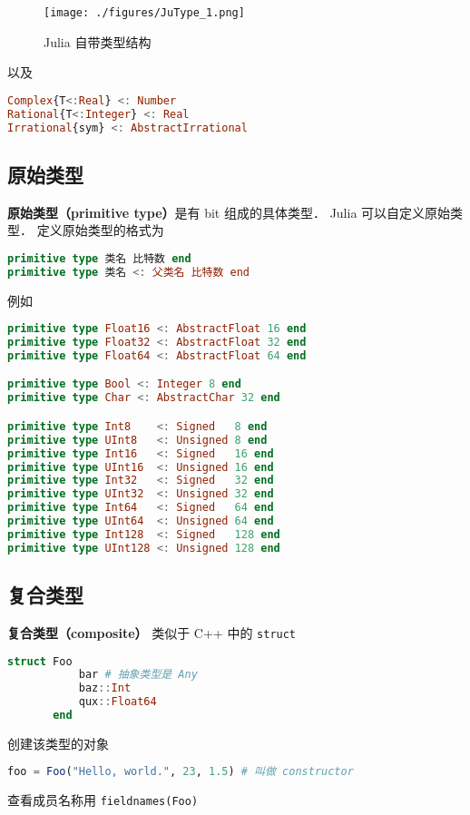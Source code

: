 \begin{figure}[ht]
\centering
\texttt{[image: ./figures/JuType\_1.png]}
\caption{Julia 自带类型结构} \label{JuType_fig1}
\end{figure}
以及
\begin{lstlisting}[language=julia]
Complex{T<:Real} <: Number
Rational{T<:Integer} <: Real
Irrational{sym} <: AbstractIrrational
\end{lstlisting}


\subsection{原始类型}
\textbf{原始类型（primitive type）}是有 bit 组成的具体类型． Julia 可以自定义原始类型． 定义原始类型的格式为
\begin{lstlisting}[language=julia]
primitive type 类名 比特数 end
primitive type 类名 <: 父类名 比特数 end
\end{lstlisting}
例如
\begin{lstlisting}[language=julia]
primitive type Float16 <: AbstractFloat 16 end
primitive type Float32 <: AbstractFloat 32 end
primitive type Float64 <: AbstractFloat 64 end

primitive type Bool <: Integer 8 end
primitive type Char <: AbstractChar 32 end

primitive type Int8    <: Signed   8 end
primitive type UInt8   <: Unsigned 8 end
primitive type Int16   <: Signed   16 end
primitive type UInt16  <: Unsigned 16 end
primitive type Int32   <: Signed   32 end
primitive type UInt32  <: Unsigned 32 end
primitive type Int64   <: Signed   64 end
primitive type UInt64  <: Unsigned 64 end
primitive type Int128  <: Signed   128 end
primitive type UInt128 <: Unsigned 128 end
\end{lstlisting}

\subsection{复合类型}
\textbf{复合类型（composite）} 类似于 C++ 中的 \verb|struct|
\begin{lstlisting}[language=julia]
struct Foo
           bar # 抽象类型是 Any
           baz::Int
           qux::Float64
       end
\end{lstlisting}
创建该类型的对象
\begin{lstlisting}[language=julia]
foo = Foo("Hello, world.", 23, 1.5) # 叫做 constructor
\end{lstlisting}
查看成员名称用 \verb|fieldnames(Foo)|

